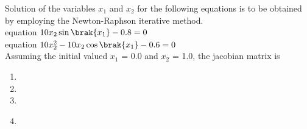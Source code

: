 \item Solution of the variables $x_1$ and $x_2$ for the following equations is to be obtained by employing the Newton-Raphson iterative method.\\
equation  \quad $10x_2\sin\brak{x_1}-0.8=0$ \\
equation  \quad $10x_2^2-10x_2\cos\brak{x_1}-0.6=0$\\
Assuming the initial valued $x_1$ = 0.0 and $x_2$ = 1.0, the jacobian matrix is 
\begin{enumerate}
    \item {}
     \item {}
     \item {}
     \item {} \\
\end{enumerate}
